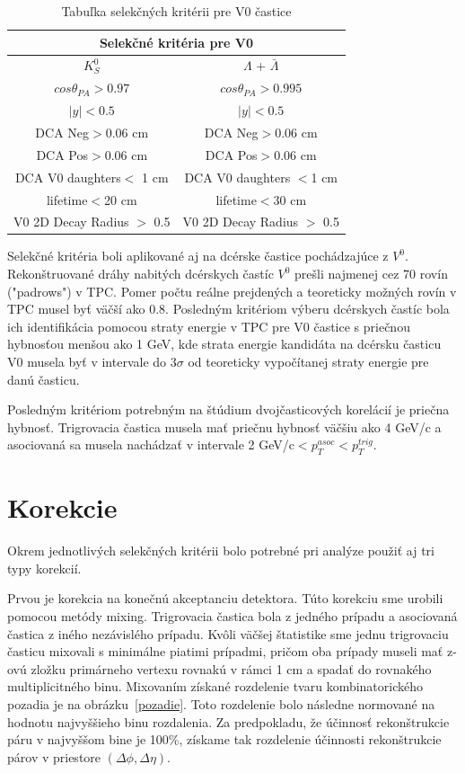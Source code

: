\documentclass[thesismargins, thesislinespacing]{rnthesis}
\begin{document}
\begin{table}[hbtp!]
	\begin{center}
		\begin{tabular}{|c|c|}
			\hline
			 \multicolumn{2}{|c|}{Selekčné kritéria pre V0}  \\ \hline
			$K^0_S$ & $\Lambda$ + $\bar{\Lambda}$ \\ \hline
			$cos\theta_{PA} >0.97$ & $cos\theta_{PA} >0.995$  \\ \hline
			$|y|<0.5$ & $|y|<0.5$   \\ \hline
			DCA Neg$>$0.06 cm & DCA Neg$>$0.06 cm \\ \hline
			DCA Pos$>$0.06 cm & DCA Pos$>$0.06 cm \\ \hline
			DCA V0 daughters$<$ 1 cm & DCA V0 daughters $<$1 cm \\ \hline
			lifetime$<$20 cm & lifetime$<$30 cm \\ \hline
			V0 2D Decay Radius $>$ 0.5 & V0 2D Decay Radius $>$ 0.5\\ 
			\hline
		\end{tabular}
		\caption{Tabuľka selekčných kritérii pre V0 častice}
		\label{tabulka}
	\end{center}
\end{table}
\newpage
Selekčné kritéria boli aplikované aj na dcérske častice pochádzajúce z $V^0$. Rekonštruované dráhy nabitých dcérskych častíc $V^0$ prešli najmenej cez 70 rovín ("padrows") v TPC. Pomer počtu reálne prejdených a teoreticky možných rovín v TPC musel byť väčší ako 0.8. Posledným kritériom výberu dcérskych častíc bola ich identifikácia pomocou straty energie v TPC pre V0 častice s priečnou hybnosťou menšou ako 1 GeV, kde strata energie kandidáta na dcérsku časticu V0 musela byť v intervale do $3\sigma$ od teoreticky vypočítanej straty energie pre danú časticu.

Posledným kritériom potrebným na štúdium dvojčasticových korelácií je priečna hybnosť. Trigrovacia častica musela mať priečnu hybnosť väčšiu ako 4 GeV/c a asociovaná sa musela nachádzať v intervale 2 GeV/c$<p_T^{asoc}<p_T^{trig}$.

\section{Korekcie}
Okrem jednotlivých selekčných kritérii bolo potrebné pri analýze použiť aj tri typy korekcií. 

Prvou je korekcia na konečnú akceptanciu detektora. Túto korekciu sme urobili pomocou metódy mixing. Trigrovacia častica bola z jedného prípadu a asociovaná častica z iného nezávislého prípadu. Kvôli väčšej štatistike sme jednu trigrovaciu časticu mixovali s minimálne piatimi prípadmi, pričom oba prípady museli mať z-ovú zložku primárneho vertexu rovnakú v rámci 1 cm a spadať do rovnakého multiplicitného binu. Mixovaním získané rozdelenie tvaru kombinatorického pozadia je na obrázku~\ref{pozadie}. Toto rozdelenie bolo následne normované na hodnotu najvyššieho binu rozdalenia. Za predpokladu, že účinnosť rekonštrukcie páru v najvyššom bine je 100\%, získame tak rozdelenie účinnosti rekonštrukcie párov v priestore $(\Delta \phi,\Delta\eta)$.
\end{document}
